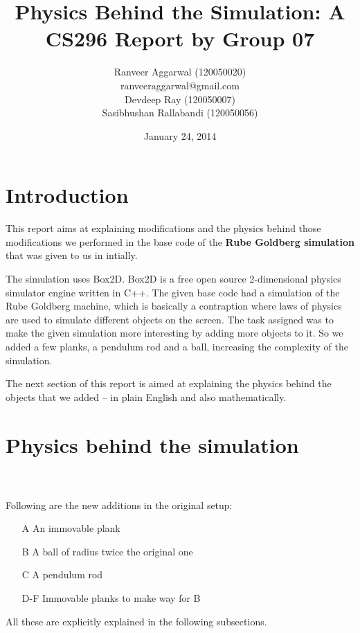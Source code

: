 \documentclass[11pt]{article}
\title{Physics Behind the Simulation: A CS296 Report by Group 07}
\author{Ranveer Aggarwal (120050020) \\ ranveeraggarwal@gmail.com \\ Devdeep Ray (120050007) \\ Sasibhushan Rallabandi (120050056)}
\date{January 24, 2014}
\begin{document}
\maketitle

\section{Introduction}
This report aims at explaining modifications and the physics behind those modifications we performed in the base code of the \textbf{Rube Goldberg simulation} that was given to us in intially.

The simulation uses Box2D. Box2D is a free open source 2-dimensional physics simulator engine written in C++. The given base code had a simulation of the Rube Goldberg machine, which is basically a contraption where laws of physics are used to simulate different objects on the screen. The task assigned was to make the given simulation more interesting by adding more objects to it. So we added a few planks, a pendulum rod and a ball, increasing the complexity of the simulation.

The next section of this report is aimed at explaining the physics behind the objects that we added -- in plain English and also mathematically.
\pagebreak

\section{Physics behind the simulation}

\setlength\fboxsep{2pt}
\setlength\fboxrule{1pt}
\\
\\
Following are the new additions in the original setup:
\begin{itemize}
\item[A] An immovable plank
\item[B] A ball of radius twice the original one
\item[C] A pendulum rod
\item[D-F] Immovable planks to make way for B
\end{itemize}
All these are explicitly explained in the following subsections.
\end{document}
